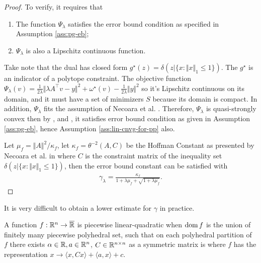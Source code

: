 \documentclass[12pt]{article}
\begin{document}
        \begin{proof}
            To verify, it requires that
            \begin{enumerate}[nosep]
                \item The function $\Psi_\lambda$ satisfies the error bound condition as specified in Assumption \ref{ass:pg-eb}; 
                \item $\Psi_\lambda$ is also a Lipschitz continuous function. 
            \end{enumerate}
            Take note that the dual has closed form $g^\star(z) =\delta(z | \{x : \Vert x\Vert_1 \le 1\})$. 
            The $g^\star$ is an indicator of a polytope constraint. 
            The objective function $\Psi_\lambda(v) = \frac{1}{2\lambda}\Vert \lambda A^\top v - y\Vert^2 + \omega^\star(v) - \frac{1}{2\lambda}\Vert y\Vert^2$ so it's Lipschitz continuous on its domain, and it must have a set of minimizers $S$ because its domain is compact. 
            In addition, $\Psi_\lambda$ fits the assumption of Necoara et al. \cite[Theorem 8]{necoara_linear_2019}. 
            Therefore, $\Psi_\lambda$ is quasi-strongly convex then by \cite[Theorem 4]{necoara_linear_2019}, and \cite[Theorem 7]{necoara_linear_2019}, it satisfies error bound condition as given in Assumption \ref{ass:pg-eb}, hence Assumption \ref{ass:lin-cnvg-for-pp} also. 
            \par
            Let $\mu_f = \Vert A\Vert^2/\kappa_f$, let $\kappa_f = \theta^{-2}(A, C)$ be the Hoffman Constant as presented by Necoara et al. in \cite[Section 4]{necoara_linear_2019} where $C$ is the constraint matrix of the inequality set $\delta(z | \{x : \Vert x\Vert_1 \le 1\})$, then the error bound constant can be satisfied with
            \begin{align*}
                \gamma_\lambda = \frac{\kappa_f}{1 + \lambda\mu_f + \sqrt{1 + \lambda\mu_f}}. 
            \end{align*}
        \end{proof}
        \begin{remark}
            It is very difficult to obtain a lower estimate for $\gamma$ in practice. 
        \end{remark}
        \begin{definition}
            A function $f: \mathbb R^n \rightarrow \overline {\mathbb R}$ is piecewise linear-quadratic when $\operatorname{dom} f$ is the union of finitely many piecewise polyhedral set, such that on each polyhedral partition of $f$ there exists $\alpha \in \mathbb R, a \in \mathbb R^n$, $C\in \mathbb R^{n \times n}$ as a symmetric matrix is where $f$ has the representation $x \rightarrow \langle x, Cx\rangle + \langle a, x\rangle + c$. 
        \end{definition}
\end{document}
